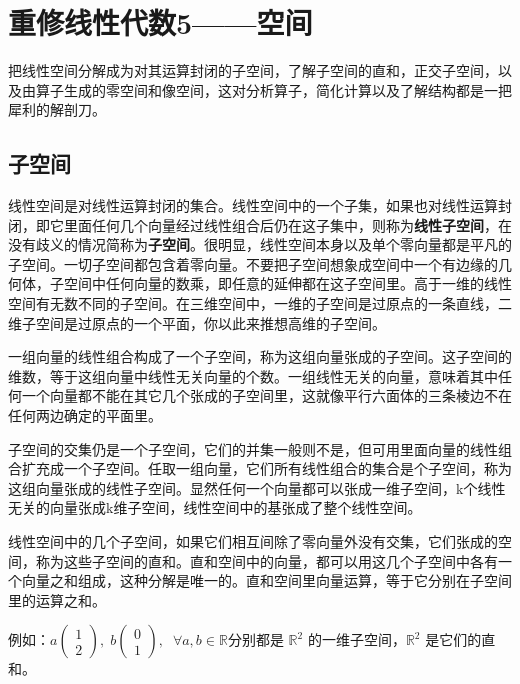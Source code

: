 	\section{重修线性代数5——空间}
	把线性空间分解成为对其运算封闭的子空间，了解子空间的直和，正交子空间，以及由算子生成的零空间和像空间，这对分析算子，简化计算以及了解结构都是一把犀利的解剖刀。
	
\subsection{子空间}
	
	线性空间是对线性运算封闭的集合。线性空间中的一个子集，如果也对线性运算封闭，即它里面任何几个向量经过线性组合后仍在这子集中，则称为\textbf{线性子空间}，在没有歧义的情况简称为\textbf{子空间}。很明显，线性空间本身以及单个零向量都是平凡的子空间。一切子空间都包含着零向量。不要把子空间想象成空间中一个有边缘的几何体，子空间中任何向量的数乘，即任意的延伸都在这子空间里。高于一维的线性空间有无数不同的子空间。在三维空间中，一维的子空间是过原点的一条直线，二维子空间是过原点的一个平面，你以此来推想高维的子空间。
	
	一组向量的线性组合构成了一个子空间，称为这组向量张成的子空间。这子空间的维数，等于这组向量中线性无关向量的个数。一组线性无关的向量，意味着其中任何一个向量都不能在其它几个张成的子空间里，这就像平行六面体的三条棱边不在任何两边确定的平面里。
	
	子空间的交集仍是一个子空间，它们的并集一般则不是，但可用里面向量的线性组合扩充成一个子空间。任取一组向量，它们所有线性组合的集合是个子空间，称为这组向量张成的线性子空间。显然任何一个向量都可以张成一维子空间，k个线性无关的向量张成k维子空间，线性空间中的基张成了整个线性空间。
	
	线性空间中的几个子空间，如果它们相互间除了零向量外没有交集，它们张成的空间，称为这些子空间的直和。直和空间中的向量，都可以用这几个子空间中各有一个向量之和组成，这种分解是唯一的。直和空间里向量运算，等于它分别在子空间里的运算之和。
	
	\kaishu
	
	例如：$ a\begin{pmatrix}1\\2\end{pmatrix},\; b\begin{pmatrix}0\\ 1\end{pmatrix}, \;\; \forall  a,b \in \mathbb{R} $分别都是 $ \mathbb{R}^2 $ 的一维子空间，$ \mathbb{R}^2 $ 是它们的直和。
	
	\songti
	
